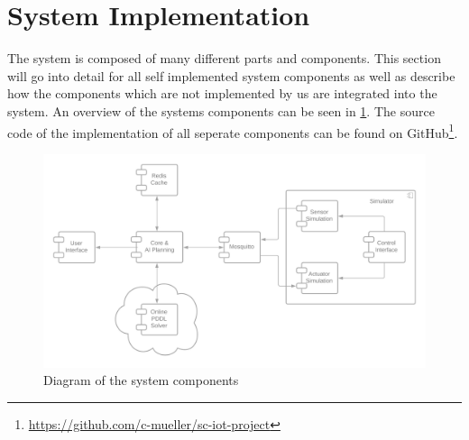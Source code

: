 \section{System Implementation}

The system is composed of many different parts and components. 
This section will go into detail for all self implemented system components as well as describe how the components which are not implemented by us are integrated into the system.
An overview of the systems components can be seen in \cref{fig:implementation-architecture}.
The source code of the implementation of all seperate components can be found on GitHub\footnote{\url{https://github.com/c-mueller/sc-iot-project}}.

\begin{figure}
    \centering
    \includegraphics[width=\linewidth]{img/implementation-architecture.png}
    \caption{Diagram of the system components}
    \label{fig:implementation-architecture}
\end{figure}

%






